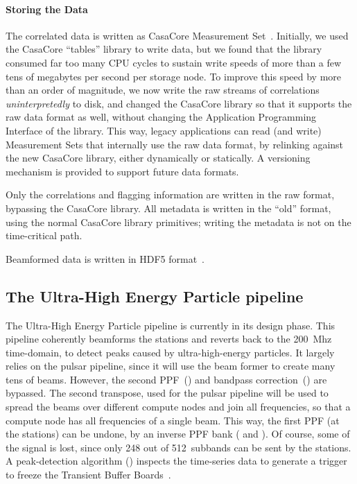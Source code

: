 \paragraph{Storing the Data }
The correlated data is written as CasaCore Measurement Set~\cite{Kemball:00}.
Initially, we used the CasaCore ``tables'' library to write data, but we
found that the library consumed far too many CPU cycles to sustain write
speeds of more than a few tens of megabytes per second per storage node.
To improve this speed by more than an order of magnitude, we now write the
raw streams of correlations \emph{uninterpretedly\/} to disk, and changed
the CasaCore library so that it supports the raw data format as well,
without changing the Application Programming Interface of the library.
This way, legacy applications can read (and write) Measurement Sets that
internally use the raw data format, by relinking against the new CasaCore
library, either dynamically or statically.
A versioning mechanism is provided to support future data formats.

Only the correlations and flagging information are written in the raw
format, bypassing the CasaCore library.
All metadata is written in the ``old'' format, using the normal CasaCore
library primitives; writing the metadata is not on the time-critical path.

Beamformed data is written in HDF5 format~\cite{?}.



\subsection{The Ultra-High Energy Particle pipeline}

The Ultra-High Energy Particle pipeline is currently in its design phase.
This pipeline coherently beamforms the stations and reverts back to the 200~Mhz
time-domain, to detect peaks caused by ultra-high-energy particles.
It largely relies on the pulsar pipeline, since it will use the beam former
to create many tens of beams.
However, the second PPF~() and bandpass
correction~() are bypassed.
The second transpose, used for the pulsar pipeline will be used to spread the
beams over different compute nodes and join all frequencies, so that a compute
node has all frequencies of a single beam.
This way, the first PPF (at the stations) can be undone, by an inverse PPF bank
( and ).
Of course, some of the signal is lost, since only 248 out of 512~subbands can
be sent by the stations.
A peak-detection algorithm () inspects the time-series data
to generate a trigger to freeze the Transient Buffer Boards~\cite{Kooistra:10}.



